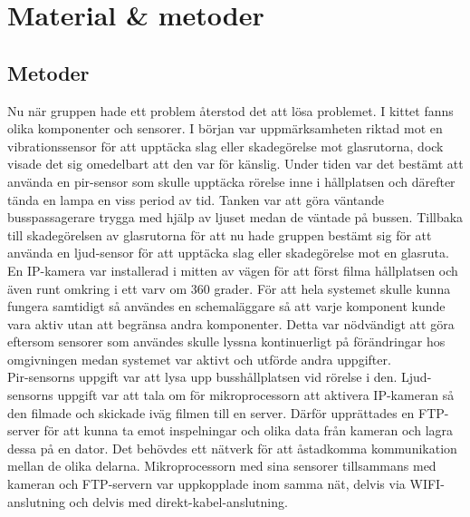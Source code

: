 



\chapter{Material \& metoder} %
\label{ch:metoder}


\ifpdf
    \graphicspath{{8/figures/PNG/}{8_materials_and_methods/figures/PDF/}{8_materials_and_methods/figures/}}
\else
    \graphicspath{{8/figures/EPS/}{8_materials_and_methods/figures/}}
\fi




\section{Metoder}
Nu när gruppen hade ett problem återstod det att lösa problemet. I kittet fanns olika komponenter och sensorer. I början var uppmärksamheten riktad mot en vibrationssensor för att upptäcka slag eller skadegörelse mot glasrutorna, dock visade det sig omedelbart att den var för känslig. Under tiden var det bestämt att använda en pir-sensor som skulle upptäcka rörelse inne i hållplatsen och därefter tända en lampa en viss period av tid. Tanken var att göra väntande busspassagerare trygga med hjälp av ljuset medan de väntade på bussen. Tillbaka till skadegörelsen av glasrutorna för att nu hade gruppen bestämt sig för att använda en ljud-sensor för att upptäcka slag eller skadegörelse mot en glasruta. En IP-kamera var installerad i mitten av vägen för att först filma hållplatsen och även runt omkring i ett varv om 360 grader. 
För att hela systemet skulle kunna fungera samtidigt så användes en schemaläggare så att varje komponent kunde vara aktiv utan att begränsa andra komponenter. Detta var nödvändigt att göra eftersom sensorer som användes skulle lyssna kontinuerligt på förändringar hos omgivningen medan systemet var aktivt och utförde andra uppgifter.\\

Pir-sensorns uppgift var att lysa upp busshållplatsen vid rörelse i den. Ljud-sensorns uppgift var att tala om för mikroprocessorn att aktivera IP-kameran så den filmade och skickade iväg filmen till en server. Därför upprättades en FTP-server för att kunna ta emot inspelningar och olika data från kameran och lagra dessa på en dator. Det behövdes ett nätverk för att åstadkomma kommunikation mellan de olika delarna. Mikroprocessorn med sina sensorer tillsammans med kameran och FTP-servern var uppkopplade inom samma nät, delvis via WIFI-anslutning och delvis med direkt-kabel-anslutning.

